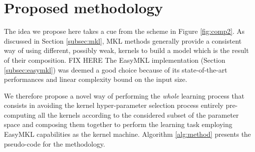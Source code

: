 \section{Proposed methodology}
\label{sec:method}
The idea we propose here takes a cue from the scheme in Figure \ref{fig:comp2}.
As discussed in Section \ref{subsec:mkl}, MKL methods generally provide a consistent
way of using different, possibly weak, kernels to build a model which is the result
of their composition.
FIX HERE
The EasyMKL implementation (Section \ref{subsec:easymkl}) was deemed a good
choice because of its state-of-the-art performances and linear complexity
bound on the input size.

We therefore propose a novel way of performing the \emph{whole} learning process
that consists in avoiding the kernel hyper-parameter selection process entirely pre-computing
all the kernels according to the considered subset of the parameter space and composing
them together to perform the learning task employing EasyMKL capabilities as the kernel
machine.
Algorithm \ref{alg:method} presents the pseudo-code for the methodology.

